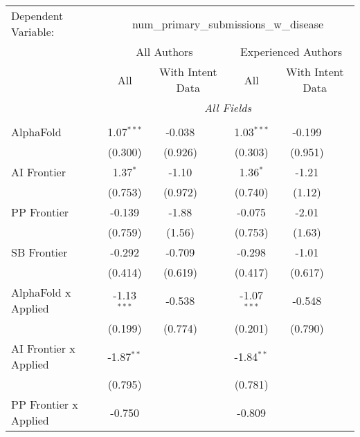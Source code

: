 \begingroup
\centering
\begin{tabular}{lcccccc}
   \tabularnewline \midrule \midrule
   Dependent Variable: & \multicolumn{6}{c}{num\_primary\_submissions\_w\_disease}\\
 & \multicolumn{3}{c}{All Authors} & \multicolumn{3}{c}{Experienced Authors} \\
\cmidrule(lr){2-4} \cmidrule(lr){5-7}
 & \multicolumn{1}{c}{All} & \multicolumn{2}{c}{With Intent Data} & \multicolumn{1}{c}{All} & \multicolumn{2}{c}{With Intent Data} \\
\cmidrule(lr){2-2} \cmidrule(lr){3-4} \cmidrule(lr){5-5} \cmidrule(lr){6-7}
 & \multicolumn{6}{c}{\textit{All Fields}} \\ \\
   AlphaFold                    & 1.07$^{***}$  & -0.038  &               & 1.03$^{***}$  & -0.199  &   \\   
                                & (0.300)       & (0.926) &               & (0.303)       & (0.951) &   \\   
   AI Frontier                  & 1.37$^{*}$    & -1.10   &               & 1.36$^{*}$    & -1.21   &   \\   
                                & (0.753)       & (0.972) &               & (0.740)       & (1.12)  &   \\   
   PP Frontier                  & -0.139        & -1.88   &               & -0.075        & -2.01   &   \\   
                                & (0.759)       & (1.56)  &               & (0.753)       & (1.63)  &   \\   
   SB Frontier                  & -0.292        & -0.709  &               & -0.298        & -1.01   &   \\   
                                & (0.414)       & (0.619) &               & (0.417)       & (0.617) &   \\   
   AlphaFold x Applied          & -1.13$^{***}$ & -0.538  &               & -1.07$^{***}$ & -0.548  &   \\   
                                & (0.199)       & (0.774) &               & (0.201)       & (0.790) &   \\   
   AI Frontier x Applied        & -1.87$^{**}$  &         &               & -1.84$^{**}$  &         &   \\   
                                & (0.795)       &         &               & (0.781)       &         &   \\   
   PP Frontier x Applied        & -0.750        &         &               & -0.809        &         &   \\   

\end{tabular}
